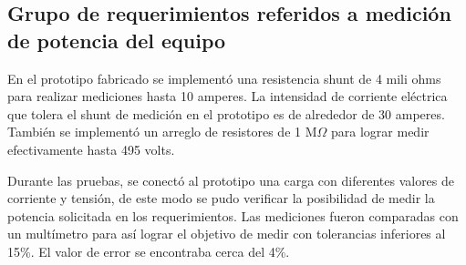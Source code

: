 \subsection{Grupo de requerimientos referidos a medición de potencia del equipo}

En el prototipo fabricado se implementó una resistencia shunt de 4 mili ohms para realizar mediciones hasta 10 amperes. La intensidad de corriente eléctrica que tolera el shunt de medición en el prototipo es de alrededor de 30 amperes. También se implementó un arreglo de resistores de 1 M$\Omega$
 para lograr medir efectivamente hasta 495 volts. 

Durante las pruebas,  se conectó al prototipo una carga con diferentes valores de corriente y tensión, de este modo se pudo verificar la posibilidad de medir la potencia  solicitada en los requerimientos. Las mediciones fueron comparadas con un multímetro para así lograr el objetivo de medir con tolerancias inferiores al 15\%. El valor de error se encontraba cerca del 4\%.









